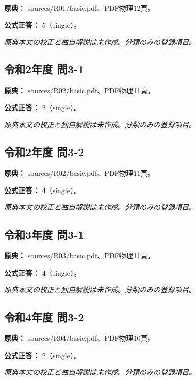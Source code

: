 \noindent\textbf{原典：} sources/R01/basic.pdf、PDF物理12頁。

\textbf{公式正答：} 5（single）。

\par\textit{原典本文の校正と独自解説は未作成。分類のみの登録項目。}

\subsection{令和2年度 問3-1}
\label{q:r02-reg-basic-3-1}

\noindent\textbf{原典：} sources/R02/basic.pdf、PDF物理11頁。

\textbf{公式正答：} 2（single）。

\par\textit{原典本文の校正と独自解説は未作成。分類のみの登録項目。}

\subsection{令和2年度 問3-2}
\label{q:r02-reg-basic-3-2}

\noindent\textbf{原典：} sources/R02/basic.pdf、PDF物理11頁。

\textbf{公式正答：} 4（single）。

\par\textit{原典本文の校正と独自解説は未作成。分類のみの登録項目。}

\subsection{令和3年度 問3-1}
\label{q:r03-reg-basic-3-1}

\noindent\textbf{原典：} sources/R03/basic.pdf、PDF物理11頁。

\textbf{公式正答：} 4（single）。

\par\textit{原典本文の校正と独自解説は未作成。分類のみの登録項目。}

\subsection{令和4年度 問3-2}
\label{q:r04-reg-basic-3-2}

\noindent\textbf{原典：} sources/R04/basic.pdf、PDF物理10頁。

\textbf{公式正答：} 2（single）。

\par\textit{原典本文の校正と独自解説は未作成。分類のみの登録項目。}

